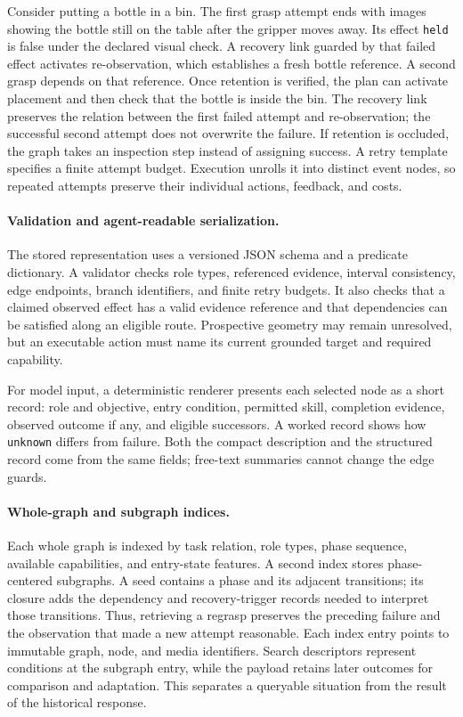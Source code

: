 Consider putting a bottle in a bin. The first grasp attempt ends with images showing the bottle still on the table after the gripper moves away. Its effect \texttt{held} is false under the declared visual check. A recovery link guarded by that failed effect activates re-observation, which establishes a fresh bottle reference. A second grasp depends on that reference. Once retention is verified, the plan can activate placement and then check that the bottle is inside the bin. The recovery link preserves the relation between the first failed attempt and re-observation; the successful second attempt does not overwrite the failure. If retention is occluded, the graph takes an inspection step instead of assigning success. A retry template specifies a finite attempt budget. Execution unrolls it into distinct event nodes, so repeated attempts preserve their individual actions, feedback, and costs.

\paragraph{Validation and agent-readable serialization.}
The stored representation uses a versioned JSON schema and a predicate dictionary. A validator checks role types, referenced evidence, interval consistency, edge endpoints, branch identifiers, and finite retry budgets. It also checks that a claimed observed effect has a valid evidence reference and that dependencies can be satisfied along an eligible route. Prospective geometry may remain unresolved, but an executable action must name its current grounded target and required capability.

For model input, a deterministic renderer presents each selected node as a short record: role and objective, entry condition, permitted skill, completion evidence, observed outcome if any, and eligible successors. A worked record shows how \texttt{unknown} differs from failure. Both the compact description and the structured record come from the same fields; free-text summaries cannot change the edge guards.

\paragraph{Whole-graph and subgraph indices.}
Each whole graph is indexed by task relation, role types, phase sequence, available capabilities, and entry-state features. A second index stores phase-centered subgraphs. A seed contains a phase and its adjacent transitions; its closure adds the dependency and recovery-trigger records needed to interpret those transitions. Thus, retrieving a regrasp preserves the preceding failure and the observation that made a new attempt reasonable. Each index entry points to immutable graph, node, and media identifiers. Search descriptors represent conditions at the subgraph entry, while the payload retains later outcomes for comparison and adaptation. This separates a queryable situation from the result of the historical response.

